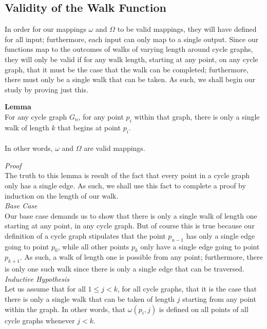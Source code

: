\documentclass[a4paper,12pt]{article}
\begin{document}
\subsection{Validity of the Walk Function}
\label{sec:validatity_of_walk_function}

In order for our mappings $\omega$ and $\Omega$ to be valid mappings, they will have defined for all input; furthermore, each input can only map to a single output. Since our functions map to the outcomes of walks of varying length around cycle graphs, they will only be valid if for any walk length, starting at any point, on any cycle graph, that it must be the case that the walk can be completed; furthermore, there must only be a single walk that can be taken. As such, we shall begin our study by proving just this.\\


\label{lemma:omega_is_valid}
\hypertarget{lemma:omega_is_valid}{}
\begin{tcolorbox}
\textbf{Lemma}\\
For any cycle graph $G_n$, for any point $p_i$ within that graph, there is only a single walk of length $k$ that begins at point $p_i$.\\
\\
In other words, $\omega$ and $\Omega$ are valid mappings.
\end{tcolorbox}


\noindent
\textit{Proof}\\
The truth to this lemma is result of the fact that every point in a cycle graph only has a single edge. As such, we shall use this fact to complete a proof by induction on the length of our walk.\\

\noindent
\textit{Base Case}\\ 
Our base case demands us to show that there is only a single walk of length one starting at any point, in any cycle graph. But of course this is true because our definition of a cycle graph stipulates that the point $p_{n-1}$ has only a single edge going to point $p_0$, while all other points $p_k$ only have a single edge going to point $p_{k+1}$. As such, a walk of length one is possible from any point; furthermore, there is only one such walk since there is only a single edge that can be traversed.\\

\noindent
\textit{Inductive Hypothesis}\\
Let us assume that for all $1 \leq j < k$, for all cycle graphs, that it is the case that there is only a single walk that can be taken of length $j$ starting from any point within the graph. In other words, that $\omega(p_i, j)$ is defined on all points of all cycle graphs whenever $j < k$.\\
\end{document}
